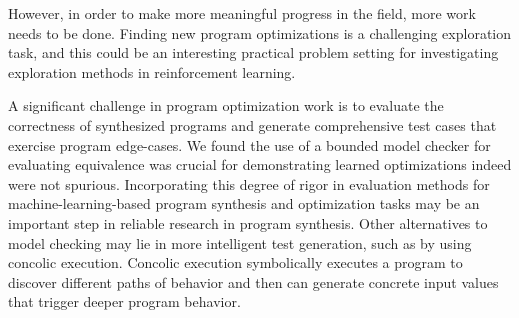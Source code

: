 \documentclass{article}
\begin{document}
However, in order to make more meaningful progress in the field, more work needs to be done. Finding new program optimizations is a challenging exploration task, and this could be an interesting practical problem setting for investigating exploration methods in reinforcement learning. 

A significant challenge in program optimization work is to evaluate the correctness of synthesized programs and generate comprehensive test cases that exercise program edge-cases. We found the use of a bounded model checker for evaluating equivalence was crucial for demonstrating learned optimizations indeed were not spurious. Incorporating this degree of rigor in evaluation methods for machine-learning-based program synthesis and optimization tasks may be an important step in reliable research in program synthesis. Other alternatives to model checking may lie in more intelligent test generation, such as by using concolic execution.  Concolic execution symbolically executes a program to discover different paths of behavior and then can generate concrete input values that trigger deeper program behavior. 






\end{document}
